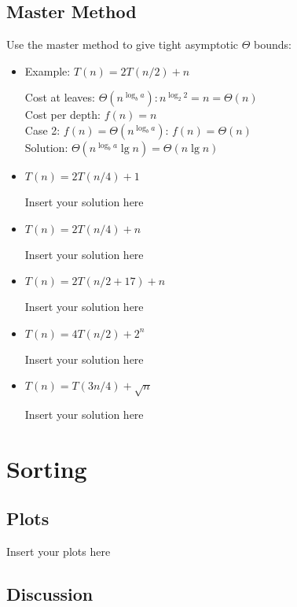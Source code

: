 \documentclass[a4paper]{article}
\begin{document}
\subsection{Master Method}

Use the master method to give tight asymptotic $\Theta$ bounds:

\begin{itemize}

\item Example: $T(n) = 2T(n/2) + n$

Cost at leaves: $\Theta(n^{\log_b a}): n^{\log_2 2}=n=\Theta(n)$ \\
Cost per depth: $f(n)=n$ \\
Case 2: $f(n) = \Theta(n^{\log_b a})$: $f(n) = \Theta(n)$ \\
Solution: $\Theta(n^{\log_b a} \lg n) = \Theta(n \lg n)$

\item $T(n) = 2T(n/4) + 1$

Insert your solution here

\item $T(n) = 2T(n/4) + n$

Insert your solution here

\item $T(n) = 2T(n/2 + 17) + n$

Insert your solution here

\item $T(n) = 4T(n/2) + 2^n$

Insert your solution here

\item $T(n) = T(3n/4) + \sqrt{n}$

Insert your solution here

\end{itemize}

\section{Sorting}

\subsection{Plots}

Insert your plots here

\subsection{Discussion}
\end{document}
